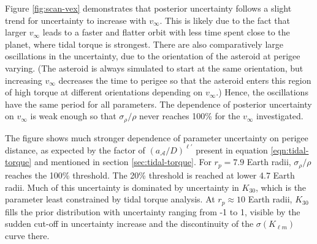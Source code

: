 \documentclass[fleqn,usenatbib]{mnras}
\begin{document}
Figure \ref{fig:scan-vex} demonstrates that posterior uncertainty follows a slight trend for uncertainty to increase with $v_\infty$. This is likely due to the fact that larger $v_\infty$ leads to a faster and flatter orbit with less time spent close to the planet, where tidal torque is strongest. There are also comparatively large oscillations in the uncertainty, due to the orientation of the asteroid at perigee varying. (The asteroid is always simulated to start at the same orientation, but increasing $v_\infty$ decreases the time to perigee so that the asteroid enters this region of high torque at different orientations depending on $v_\infty$.) Hence, the oscillations have the same period for all parameters. The dependence of posterior uncertainty on $v_\infty$ is weak enough so that $\sigma_\rho/\rho$ never reaches 100\% for the $v_\infty$ investigated.


The figure shows much stronger dependence of parameter uncertainty on perigee distance, as expected by the factor of $(a_\mathcal{A}/D)^{\ell'}$ present in equation \ref{eqn:tidal-torque} and mentioned in section \ref{sec:tidal-torque}. For $r_p =7.9$ Earth radii, $\sigma_\rho/\rho$ reaches the 100\% threshold. The 20\% threshold is reached at lower 4.7 Earth radii. Much of this uncertainty is dominated by uncertainty in $K_{30}$, which is the parameter least constrained by tidal torque analysis. At $r_p \approx 10$ Earth radii, $K_{30}$ fills the prior distribution with uncertainty ranging from -1 to 1, visible by the sudden cut-off in uncertainty increase and the discontinuity of the $\sigma(K_{\ell m})$ curve there.

\end{document}
